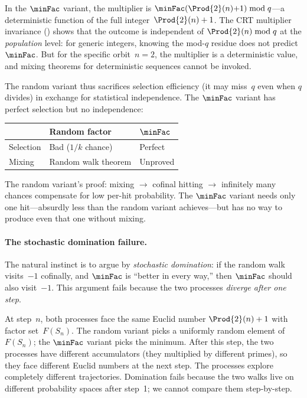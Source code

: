 In the $\minFac$ variant, the multiplier is
$\minFac(\Prod{2}(n){+}1) \bmod q$---a deterministic function of the
full integer~$\Prod{2}(n)+1$.  The CRT multiplier invariance
() shows
that the outcome is independent of $\Prod{2}(n) \bmod q$ at the
\emph{population} level: for generic integers, knowing the mod-$q$
residue does not predict $\minFac$.  But for the specific orbit~$n=2$,
the multiplier is a deterministic value, and mixing theorems for
deterministic sequences cannot be invoked.

The random variant thus sacrifices selection efficiency (it may
miss~$q$ even when $q$ divides) in exchange for statistical
independence.  The $\minFac$ variant has perfect selection but no
independence:

\smallskip
\begin{center}
\begin{tabular}{l@{\quad}l@{\quad}l}
\toprule
 & \textbf{Random factor} & $\boldsymbol{\minFac}$ \\
\midrule
Selection & Bad ($1/k$ chance) & Perfect \\
Mixing & Random walk theorem & Unproved \\
\bottomrule
\end{tabular}
\end{center}

\smallskip\noindent
The random variant's proof: mixing $\to$ cofinal hitting $\to$
infinitely many chances compensate for low per-hit probability.
The $\minFac$ variant needs only one hit---absurdly less than the
random variant achieves---but has no way to produce even that one
without mixing.

\paragraph{The stochastic domination failure.}
\label{sec:stoch-dom}
The natural instinct is to argue by \emph{stochastic domination}:
if the random walk visits~$-1$ cofinally, and $\minFac$ is ``better
in every way,'' then $\minFac$ should also visit~$-1$.  This argument
fails because the two processes \emph{diverge after one step}.

At step~$n$, both processes face the same Euclid number
$\Prod{2}(n)+1$ with factor set~$F(S_n)$.  The random variant picks a
uniformly random element of~$F(S_n)$; the $\minFac$ variant picks the
minimum.  After this step, the two processes have different
accumulators (they multiplied by different primes), so they face
different Euclid numbers at the next step.  The processes explore
completely different trajectories.  Domination fails because the
two walks live on different probability spaces after step~1; we
cannot compare them step-by-step.


